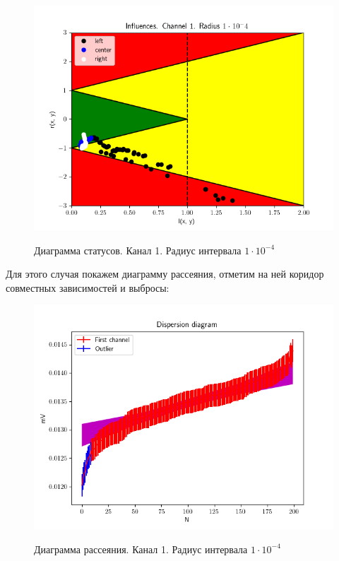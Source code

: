 \begin{figure}[H]
	\begin{center}
		\includegraphics[scale=0.77]{status_ch1_rad1}
		\label{pic:ch11}
		\caption{Диаграмма статусов. Канал 1. Радиус интервала $1 \cdot 10 ^ {-4}$}
	\end{center}
\end{figure}

Для этого случая покажем диаграмму рассеяния, отметим на ней коридор совместных зависимостей и выбросы:

\begin{figure}[H]
	\begin{center}
		\includegraphics[scale=0.77]{dispd}
		\label{pic:d1}
		\caption{Диаграмма рассеяния. Канал 1. Радиус интервала $1 \cdot 10 ^ {-4}$}
	\end{center}
\end{figure}

